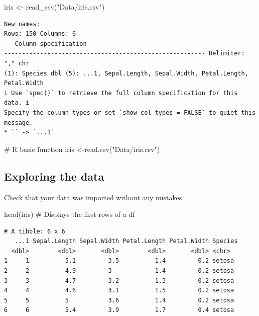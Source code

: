 \documentclass[
  letterpaper,
  DIV=11,
  numbers=noendperiod,
  oneside]{scrartcl}
\newenvironment{Shaded}{\begin{snugshade}}{\end{snugshade}}
\newcommand{\CommentTok}[1]{\textcolor[rgb]{0.37,0.37,0.37}{#1}}
\newcommand{\FunctionTok}[1]{\textcolor[rgb]{0.28,0.35,0.67}{#1}}
\newcommand{\NormalTok}[1]{\textcolor[rgb]{0.00,0.23,0.31}{#1}}
\newcommand{\OtherTok}[1]{\textcolor[rgb]{0.00,0.23,0.31}{#1}}
\newcommand{\StringTok}[1]{\textcolor[rgb]{0.13,0.47,0.30}{#1}}
\begin{document}
\begin{Shaded}
\begin{Highlighting}[numbers=left,,]
\NormalTok{iris }\OtherTok{\textless{}{-}} \FunctionTok{read\_csv}\NormalTok{(}\StringTok{"Data/iris.csv"}\NormalTok{)}
\end{Highlighting}
\end{Shaded}

\begin{verbatim}
New names:
Rows: 150 Columns: 6
-- Column specification
-------------------------------------------------------- Delimiter: "," chr
(1): Species dbl (5): ...1, Sepal.Length, Sepal.Width, Petal.Length,
Petal.Width
i Use `spec()` to retrieve the full column specification for this data. i
Specify the column types or set `show_col_types = FALSE` to quiet this message.
* `` -> `...1`
\end{verbatim}

\begin{Shaded}
\begin{Highlighting}[]
\CommentTok{\# R basic function}
\NormalTok{iris }\OtherTok{\textless{}{-}}\FunctionTok{read.csv}\NormalTok{(}\StringTok{"Data/iris.csv"}\NormalTok{)}
\end{Highlighting}
\end{Shaded}

\subsection{Exploring the data}\label{exploring-the-data}

Check that your data was imported without any mistakes

\begin{Shaded}
\begin{Highlighting}[]
\FunctionTok{head}\NormalTok{(iris)    }\CommentTok{\# Displays the first rows of a df}
\end{Highlighting}
\end{Shaded}

\begin{verbatim}
# A tibble: 6 x 6
   ...1 Sepal.Length Sepal.Width Petal.Length Petal.Width Species
  <dbl>        <dbl>       <dbl>        <dbl>       <dbl> <chr>  
1     1          5.1         3.5          1.4         0.2 setosa 
2     2          4.9         3            1.4         0.2 setosa 
3     3          4.7         3.2          1.3         0.2 setosa 
4     4          4.6         3.1          1.5         0.2 setosa 
5     5          5           3.6          1.4         0.2 setosa 
6     6          5.4         3.9          1.7         0.4 setosa 
\end{verbatim}
\end{document}

